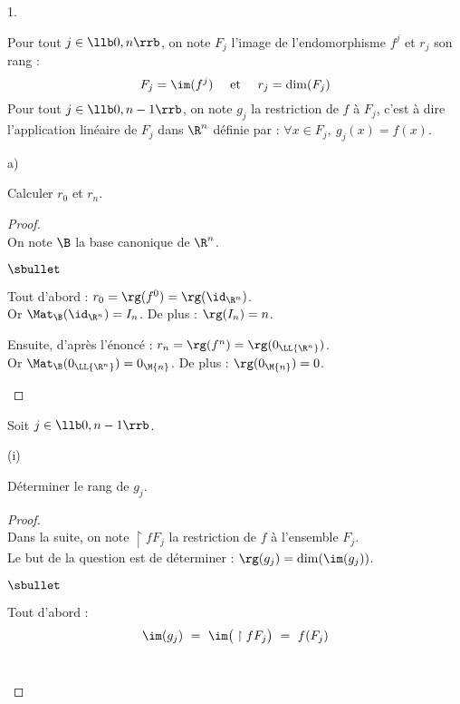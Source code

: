 \documentclass[11pt]{article}%
\begin{document}
\begin{noliste}{1.}
  
  
  
\item Pour tout $j \in \llb 0,n \rrb$, on note $F_j$ l'image de
  l'endomorphisme $f^j$ et $r_j$ son rang : 
  \[
  F_j = \im(f^j) \quad \text{ et } \quad r_j = \dim(F_j)
  \]
  Pour tout $j \in \llb 0, n-1 \rrb$, on note $g_j$ la restriction de
  $f$ à $F_j$, c'est à dire l'application linéaire de $F_j$ dans
  $\R^n$ définie par : $\forall x \in F_j, \ g_j(x)=f(x)$.
  \begin{noliste}{a)}
    \setlength{\itemsep}{2mm}
    \item Calculer $r_0$ et $r_n$.
    
    \begin{proof}~\\
    On note $\B$ la base canonique de $\R^n$.
    \begin{noliste}{$\sbullet$}
    \item Tout d'abord : $r_0 = \rg(f^0) = \rg(\id_{\R^n})$.\\[.1cm]
      Or $\Mat_\B(\id_{\R^n})=I_n$. De plus : $\rg(I_n)=n$. %
      
    \item Ensuite, d'après l'énoncé : $r_n = \rg(f^n) =
      \rg(0_{\LL{\R^n}})$.\\[.1cm]
      Or $\Mat_\B(0_{\LL{\R^n}}) = 0_{\M{n}}$. De plus :
      $\rg(0_{\M{n}}) = 0$.
      ~\\[-1.4cm]
    \end{noliste}
  \end{proof}

    
    \item Soit $j \in \llb 0,n-1\rrb$.
    \begin{nonoliste}{(i)}
      \item Déterminer le rang de $g_j$.
    \end{nonoliste}

    \begin{proof}~\\%
      Dans la suite, on note $\restriction{f}{F_j}$ la restriction de
      $f$ à l'ensemble $F_j$.\\
      Le but de la question est de déterminer : $\rg(g_j) = \dim(\im(g_j))$.
      \begin{noliste}{$\sbullet$}
      \item Tout d'abord :
        \[
        \im(g_j) \ = \ \im\big( \restriction{f}{F_j} \big) \ = \
        f(F_j)
        \]~\\[-1cm]
        


\end{noliste}
\end{proof}
\end{noliste}
\end{noliste}
\end{document}
